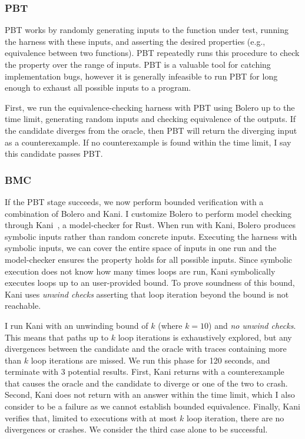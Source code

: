\documentclass[12pt,openany,oneside,table]{cmuthesis}
\begin{document}
\subsubsection{PBT}
PBT works by randomly generating inputs to the function under
test, running the harness with these inputs, and asserting the desired
properties (e.g., equivalence between two functions). PBT repeatedly runs this procedure to
check the property over the range of inputs. PBT is a valuable tool for catching implementation bugs,
however it is generally infeasible to run PBT for long enough to exhaust all possible inputs to a program.

First, we run the equivalence-checking
harness with PBT using Bolero up to the time limit, generating random
inputs and checking equivalence of the outputs. If the candidate
diverges from the oracle, then PBT will return the diverging input as
a counterexample. If no counterexample is found within the time limit,
I say this candidate passes PBT.

\subsubsection{BMC}
If the PBT stage succeeds, we now perform bounded verification with
a combination of Bolero and Kani. 
I customize Bolero to perform model checking through Kani~\cite{vanhattum2022kani},
a model-checker for Rust. When run with Kani, Bolero produces
symbolic inputs rather than random concrete inputs. Executing the
harness with symbolic inputs, we can cover the entire space of inputs
in one run and the model-checker ensures the property holds for all
possible inputs. Since symbolic execution does not know how many times
loops are run, Kani symbolically executes loops up to an user-provided
bound. To prove soundness of this bound, Kani uses {\it unwind checks}
asserting that loop iteration beyond the bound is not reachable. 

I run Kani with an unwinding bound of $k$ (where $k = 10$) and \textit{no unwind checks}. This means that paths up
to $k$ loop iterations is exhaustively explored, but any divergences
between the candidate and the oracle with traces containing more than
$k$ loop iterations are missed. We run this phase for 120 seconds, and
terminate with 3 potential results. First, Kani returns with a
counterexample that causes the oracle and the candidate to diverge or
one of the two to crash. Second, Kani does not return with an answer
within the time limit, which I also consider to be a failure as we
cannot establish bounded equivalence. Finally, Kani verifies that,
limited to executions with at most $k$ loop iteration, there are no
divergences or crashes. We consider the third case alone to be
successful. 
\end{document}
